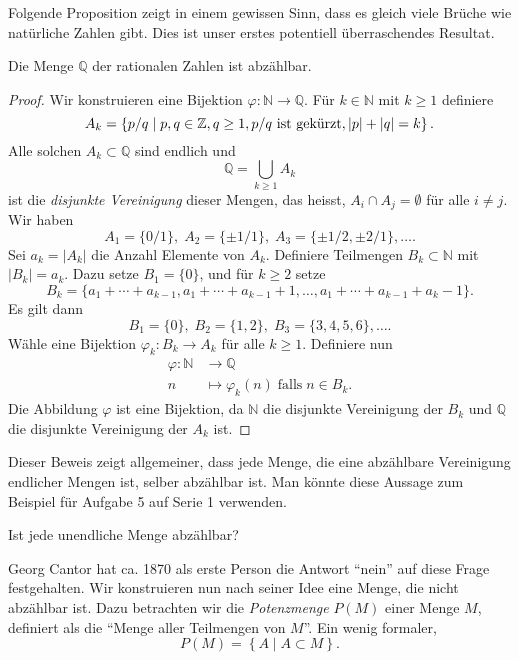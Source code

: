 \documentclass[../main.tex]{subfiles}
\begin{document}
Folgende Proposition zeigt in einem gewissen Sinn, dass es gleich viele Brüche
wie natürliche Zahlen gibt. Dies ist unser erstes potentiell überraschendes
Resultat.

\begin{proposition}\label{prop:q-countable}
  Die Menge $\mathbb Q$ der rationalen Zahlen ist abzählbar.
\end{proposition}


\begin{proof}
  Wir konstruieren eine Bijektion $\varphi \colon \mathbb N \to \mathbb Q$.
  Für $k \in \mathbb N$ mit $k \geq 1$ definiere
  \[
    A_{k} = \left\{p/q \mid p, q \in \mathbb Z, q \geq 1, p/q \textup{ ist gekürzt},
    |p| + |q| = k\right\}.
  \]
  Alle solchen $A_{k} \subset \mathbb Q$ sind endlich und
  \[
    \mathbb Q = \bigcup_{k \geq 1} A_{k}
  \]
  ist die \emph{disjunkte Vereinigung} dieser Mengen,
  das heisst, $A_i \cap A_j = \emptyset$ für alle $i \neq j$.
  Wir haben
  \[
    A_{1} = \{0/1\}, \; A_{2} = \{\pm 1/1\}, \; A_{3} = \{\pm 1/2, \pm 2/1\}, \dots.
  \]
  Sei $a_{k} = |A_{k}|$ die Anzahl Elemente von $A_{k}$.
  Definiere Teilmengen $B_{k} \subset \mathbb N$ mit $|B_{k}| = a_{k}$.
  Dazu setze $B_{1} = \{0\}$, und für $k \geq 2$ setze
  \[
    B_{k} = \{a_{1} + \cdots + a_{k-1},
    a_{1} + \cdots + a_{k-1} + 1, \dots,
    a_{1} + \cdots + a_{k-1} + a_{k} - 1\}.
  \]
  Es gilt dann
  \[
    B_{1} = \{0\}, \; B_{2} = \{1, 2\}, \; B_{3} = \{3, 4, 5, 6\}, \dots.
  \]
Wähle eine Bijektion $\varphi_{k} \colon B_{k} \to A_{k}$ für alle $k \geq 1$.
Definiere nun
\begin{align*}
  \varphi \colon \mathbb N &\to \mathbb Q \\
  n &\mapsto \varphi_{k}(n) \;\text{falls}\; n \in B_{k}.
\end{align*}
Die Abbildung $\varphi$ ist eine Bijektion, da $\mathbb N$ die disjunkte
Vereinigung der $B_{k}$ und $\mathbb Q$ die disjunkte Vereinigung
der $A_{k}$ ist.
\end{proof}

Dieser Beweis zeigt allgemeiner, dass jede Menge, die eine abzählbare Vereinigung
endlicher Mengen ist, selber abzählbar ist. Man könnte diese Aussage
zum Beispiel für Aufgabe 5 auf Serie 1 verwenden.

\begin{question}
  Ist jede unendliche Menge abzählbar?
\end{question}

Georg Cantor hat ca. 1870 als erste Person die Antwort ``nein'' auf diese Frage
festgehalten.
Wir konstruieren nun nach seiner Idee
eine Menge, die nicht abzählbar ist.
Dazu betrachten wir die \emph{Potenzmenge} $P(M)$
einer Menge $M$, definiert als die ``Menge aller Teilmengen von $M$''.
Ein wenig formaler,
\[P(M) = \left\{A \mid A \subset M\right\}.\]
\end{document}
